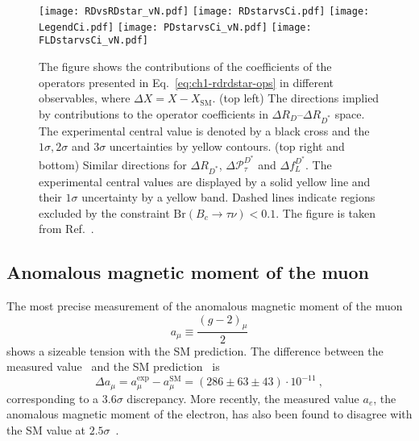 \begin{figure}
  \centering
  \texttt{[image: RDvsRDstar\_vN.pdf]}
  \texttt{[image: RDstarvsCi.pdf]}
  \texttt{[image: LegendCi.pdf]}
  \texttt{[image: PDstarvsCi\_vN.pdf]}
  \texttt{[image: FLDstarvsCi\_vN.pdf]}
  \caption[Individual contributions of the Wilson coefficients of the WET
  Hamiltonian in different observables ($\Delta X \equiv X-X_{\text{SM}}$):
  correlation between $\Delta {\cal R}_D$ and $\Delta {\cal R}_{D^*}$, and
  $\Delta \mathcal{R}_{D^*}$, $\Delta \mathcal{P}_\tau^{D^{*}}$ and
  $\Delta {\cal F}_L^{D^{*}}$ as a function of the Wilson coefficients.]{The
    figure shows the contributions of the coefficients of the operators presented
    in Eq.~\eqref{eq:ch1-rdrdstar-ops} in different observables, where
    $\Delta X = X - X_{\text{SM}}$. (top left) The directions implied by
    contributions to the operator coefficients in
    $\Delta R_{D}$--$\Delta R_{D^{*}}$ space. The experimental central value is
    denoted by a black cross and the $1\sigma, 2\sigma$ and $3\sigma$
    uncertainties by yellow contours. (top right and bottom) Similar directions
    for $\Delta R_{D^{*}}$, $\Delta \mathcal{P}_{\tau}^{D^{*}}$ and
    $\Delta f_{L}^{D^{*}}$. The experimental central values are displayed by a
    solid yellow line and their $1\sigma$ uncertainty by a yellow band. Dashed
    lines indicate regions excluded by the constraint
    $\mathrm{Br}(B_c \to \tau \nu) < 0.1$. The figure is taken from
    Ref.~\cite{Murgui:2019czp}.}
  \label{fig:ch1-rd-rdstar-fit}
\end{figure}

\subsection{Anomalous magnetic moment of the muon}

The most precise measurement of the anomalous magnetic moment of the muon
\begin{equation}
  a_{\mu} \equiv \frac{(g-2)_{\mu}}{2}
\end{equation}
shows a sizeable tension with the SM prediction. The difference between the
measured value~\cite{Chapelain:2017syu, Blum:2013xva} and the SM
prediction~\cite{Davier:2010nc} is
\begin{equation}
  \Delta a_\mu= a_\mu^{\text{exp}} - a_\mu^{\text{SM}}= (286 \pm 63 \pm 43) \cdot 10^{-11} \ ,
\end{equation}
corresponding to a $3.6\sigma$ discrepancy. More recently, the measured value
$a_{e}$, the anomalous magnetic moment of the electron, has also been found to
disagree with the SM value at $2.5\sigma$~\cite{Articleparker, PMID:33268866}.

